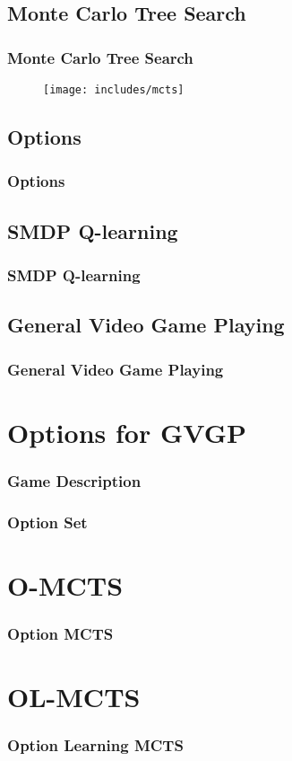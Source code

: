 \documentclass{beamer}
\begin{document}
\subsection{Monte Carlo Tree Search}
\begin{frame}
	\frametitle{Monte Carlo Tree Search}
	\begin{figure}
	\centering
	\texttt{[image: includes/mcts]}
	\end{figure}
\end{frame}

\subsection{Options}
\begin{frame}
	\frametitle{Options}
\end{frame}

\subsection{SMDP Q-learning}
\begin{frame}
	\frametitle{SMDP Q-learning}
\end{frame}

\subsection{General Video Game Playing}
\begin{frame}
	\frametitle{General Video Game Playing}
\end{frame}

\section{Options for GVGP}
\begin{frame}
	\frametitle{Game Description}
\end{frame}

\begin{frame}
	\frametitle{Option Set}
\end{frame}

\section{O-MCTS}
\begin{frame}
	\frametitle{Option MCTS}
\end{frame}

\section{OL-MCTS}
\begin{frame}
	\frametitle{Option Learning MCTS}
\end{frame}
\end{document}
